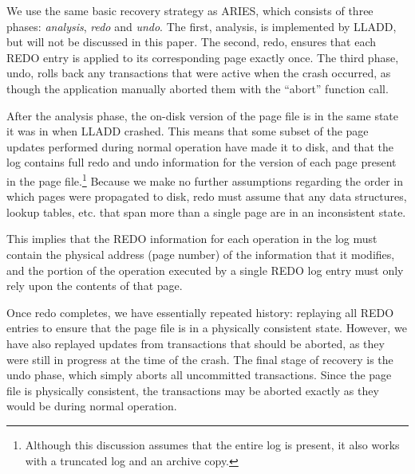 \documentclass[10pt,letterpaper,twocolumn,english]{article}
\newcommand{\yad}{LLADD\xspace}
\begin{document}
%

We use the same basic recovery strategy as ARIES, which consists of
three phases: {\em analysis}, {\em redo} and {\em undo}.  The first,
analysis, is implemented by \yad, but will not be discussed in this
paper. The second, redo, ensures that each REDO entry is applied to
its corresponding page exactly once.  The third phase, undo, rolls
back any transactions that were active when the crash occurred, as
though the application manually aborted them with the ``abort''
function call.
  
After the analysis phase, the on-disk version of the page file is in
the same state it was in when \yad crashed. This means that some
subset of the page updates performed during normal operation have made
it to disk, and that the log contains full redo and undo information
for the version of each page present in the page
file.\footnote{Although this discussion assumes that the entire log is
present, it also works with a truncated log and an archive copy.}
Because we make no further assumptions regarding the order in which
pages were propagated to disk, redo must assume that any data
structures, lookup tables, etc. that span more than a single page are
in an inconsistent state. 

This implies that the REDO information for each operation in the log
must contain the physical address (page number) of the information
that it modifies, and the portion of the operation executed by a
single REDO log entry must only rely upon the contents of that
page.

Once redo completes, we have essentially repeated history: replaying
all REDO entries to ensure that the page file is in a physically
consistent state.  However, we have also replayed updates from transactions
that should be aborted, as they were still in progress at the time of
the crash.  The final stage of recovery is the undo phase, which simply
aborts all uncommitted transactions. Since the page file is physically
consistent, the transactions may be aborted exactly as they would be
during normal operation.
\end{document}
